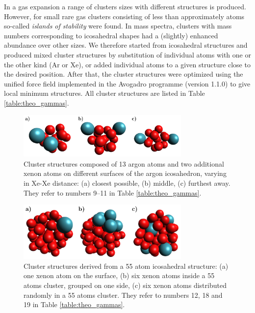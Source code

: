 In a gas expansion a range of clusters sizes with different structures is produced. 
However, for small rare gas clusters consisting of less than approximately \unit[1000]{atoms} so-called \emph{islands of stability} were found.\cite{haberland}  
In mass spectra, clusters with mass numbers corresponding to icosahedral shapes had a (slightly) enhanced abundance over other sizes. 
We therefore started from icosahedral structures and produced mixed cluster structures by substitution of individual atoms with one or the other kind (Ar or Xe), or added individual atoms to a given structure close to the desired position. 
After that, the cluster structures were optimized using the unified force
field implemented in the 
Avogadro programme (version 1.1.0) \cite{Avogadro,Hanwell12} to give local
minimum structures.
All cluster structures are listed in Table \ref{table:theo_gammas}.
%
\begin{figure}[ht]
 \centering
 \includegraphics[width=8.5cm]{pics/cluster_2_overview.pdf}
 \caption{Cluster structures composed of 13 argon atoms and two additional xenon
          atoms on different surfaces of the argon icosahedron, varying in Xe-Xe distance:
          (a) closest possible, (b) middle, (c) furthest away. They refer to
          numbers 9--11 in Table \ref{table:theo_gammas}.}
 \label{figure:cluster_2_overview}
\end{figure}
%
\begin{figure}[h]
 \centering
 \includegraphics[width=8.5cm]{pics/cluster_3_overview.pdf}
 \caption{Cluster structures derived from a 55 atom icosahedral structure:
          (a) one xenon atom on the surface, (b) six xenon atoms inside a 55 atoms cluster,
          grouped on one side, (c) six xenon atoms distributed randomly
          in a 55 atoms cluster. They refer to numbers 12, 18 and 19
          in Table \ref{table:theo_gammas}.}
 \label{figure:cluster_3_overview}
\end{figure}

